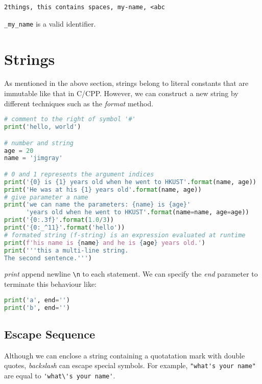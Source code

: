 \begin{lstlisting}
2things, this contains spaces, my-name, <abc
\end{lstlisting}

\verb|_my_name| is a valid identifier.

\section{Strings}
\label{sec:py-strings}

As mentioned in the above section, strings belong to literal
constants that are immutable like that in C/CPP. However, we can
construct a new string by different techniques such as the
\textit{format} method.

\begin{lstlisting}[language=python,caption={Python Strings},label={lst:py-strings}]
# comment to the right of symbol '#'
print('hello, world')

# number and string
age = 20
name = 'jimgray'

# 0 and 1 represents the argument indices
print('{0} is {1} years old when he went to HKUST'.format(name, age))
print('He was at his {1} years old'.format(name, age))
# give parameter a name
print('we can name the parameters: {name} is {age}'
      'years old when he went to HKUST'.format(name=name, age=age))
print('{0:.3f}'.format(1.0/3))
print('{0:_^11}'.format('hello'))
# formated string (f-string) is an expression evaluated at runtime
print(f'his name is {name} and he is {age} years old.')
print('''this a multi-line string.
The second sentence.''')
\end{lstlisting}

\textit{print} append newline \verb|\n| to each statement. We can
specify the \textit{end} parameter to terminate this behaviour
like:

\begin{lstlisting}[language=python]
print('a', end='')
print('b', end='')
\end{lstlisting}

\subsection{Escape Sequence}
\label{sec:py-escape-sequence}

Although we can enclose a string containing a quotatation mark
with double quotes, \textit{backslash} can escape special
symbols. For example, \verb|"what's your name"| are equal to
\verb|'what\'s your name'|.

